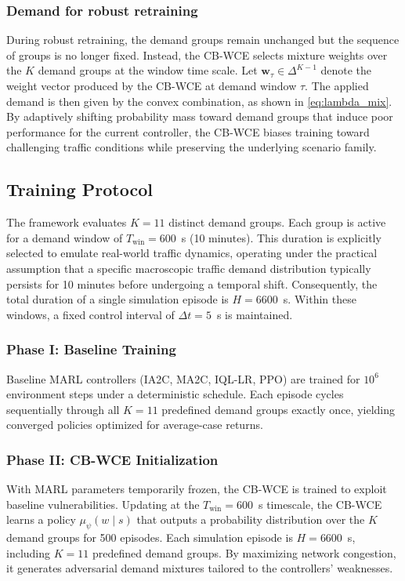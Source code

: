\documentclass[lettersize,journal]{IEEEtran}
\begin{document}
\subsubsection{Demand for robust retraining}
During robust retraining, the demand groups remain unchanged but the sequence of groups is no longer fixed. Instead, the CB-WCE selects mixture weights over the $K$ demand groups at the window time scale. Let $\mathbf{w}_\tau \in \Delta^{K-1}$ denote the weight vector produced by the CB-WCE at demand window $\tau$. The applied demand is then given by the convex combination, as shown in \cref{eq:lambda_mix}. By adaptively shifting probability mass toward demand groups that induce poor performance for the current controller, the CB-WCE biases training toward challenging traffic conditions while preserving the underlying scenario family.

\subsection{Training Protocol}
\label{subsec:training}
The framework evaluates $K=11$ distinct demand groups. Each group is active for a demand window of $T_{\mathrm{win}} = 600$~s (10 minutes). This duration is explicitly selected to emulate real-world traffic dynamics, operating under the practical assumption that a specific macroscopic traffic demand distribution typically persists for 10 minutes before undergoing a temporal shift. Consequently, the total duration of a single simulation episode is $H = 6600$~s. Within these windows, a fixed control interval of $\Delta t = 5$~s is maintained.

\subsubsection{Phase I: Baseline Training}
Baseline MARL controllers (IA2C, MA2C, IQL-LR, PPO) are trained for $10^6$ environment steps under a deterministic schedule. Each episode cycles sequentially through all $K=11$ predefined demand groups exactly once, yielding converged policies optimized for average-case returns.

\subsubsection{Phase II: CB-WCE Initialization}
With MARL parameters temporarily frozen, the CB-WCE is trained to exploit baseline vulnerabilities. Updating at the $T_{\mathrm{win}} = 600$~s timescale, the CB-WCE learns a policy $\mu_\psi(w \mid s)$ that outputs a probability distribution over the $K$ demand groups for 500 episodes. Each simulation episode is $H = 6600$~s, including $K=11$ predefined demand groups. By maximizing network congestion, it generates adversarial demand mixtures tailored to the controllers' weaknesses.
\end{document}
